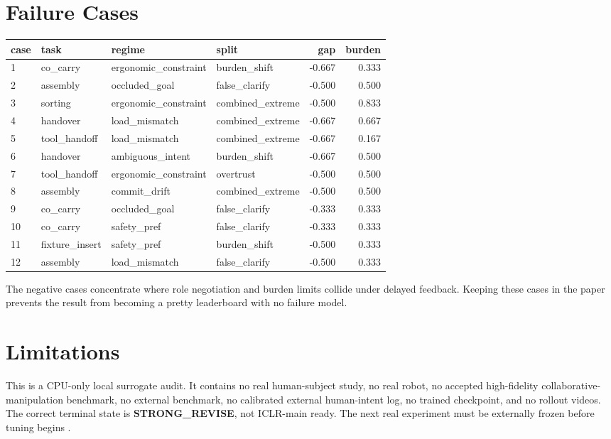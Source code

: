 \documentclass{article}
\begin{document}
\section{Failure Cases}
\begingroup
\scriptsize
\setlength{\tabcolsep}{3pt}
\begin{tabular}{llllrr}
\toprule
case & task & regime & split & gap & burden\\
\midrule
1 & co\_carry & ergonomic\_constraint & burden\_shift & -0.667 & 0.333 \\
2 & assembly & occluded\_goal & false\_clarify & -0.500 & 0.500 \\
3 & sorting & ergonomic\_constraint & combined\_extreme & -0.500 & 0.833 \\
4 & handover & load\_mismatch & combined\_extreme & -0.667 & 0.667 \\
5 & tool\_handoff & load\_mismatch & combined\_extreme & -0.667 & 0.167 \\
6 & handover & ambiguous\_intent & burden\_shift & -0.667 & 0.500 \\
7 & tool\_handoff & ergonomic\_constraint & overtrust & -0.500 & 0.500 \\
8 & assembly & commit\_drift & combined\_extreme & -0.500 & 0.500 \\
9 & co\_carry & occluded\_goal & false\_clarify & -0.333 & 0.333 \\
10 & co\_carry & safety\_pref & false\_clarify & -0.333 & 0.333 \\
11 & fixture\_insert & safety\_pref & burden\_shift & -0.500 & 0.333 \\
12 & assembly & load\_mismatch & false\_clarify & -0.500 & 0.333 \\
\bottomrule
\end{tabular}
\endgroup

The negative cases concentrate where role negotiation and burden limits collide under delayed feedback. Keeping these cases in the paper prevents the result from becoming a pretty leaderboard with no failure model.

\section{Limitations}
This is a CPU-only local surrogate audit. It contains no real human-subject study, no real robot, no accepted high-fidelity collaborative-manipulation benchmark, no external benchmark, no calibrated external human-intent log, no trained checkpoint, and no rollout videos. The correct terminal state is \textbf{STRONG\_REVISE}, not ICLR-main ready. The next real experiment must be externally frozen before tuning begins \citep{zafar2024exploring59,zheng2023a60,lorenzini2023ergonomic61,chen2022an62,askarpour2020how63,inkulu2022challenges64,hoffman2024inferring65,armleder2022interactive66,marinelli2023from67,shah2025advancements68,hopko2022human69,hoffman2019evaluating70,chen2026perceptiondecisionexecution71,carissoli2023mental72}.
\end{document}

